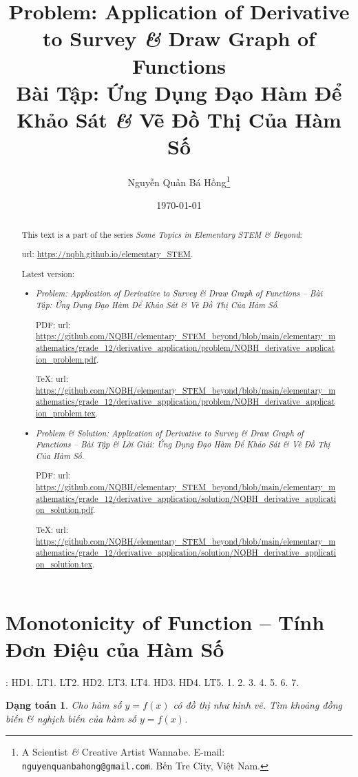 \documentclass{article}
\title{Problem: Application of Derivative to Survey {\it\&} Draw Graph of Functions\\Bài Tập: Ứng Dụng Đạo Hàm Để Khảo Sát {\it\&} Vẽ Đồ Thị Của Hàm Số}
\author{Nguyễn Quản Bá Hồng\footnote{A Scientist {\it\&} Creative Artist Wannabe. E-mail: {\tt nguyenquanbahong@gmail.com}. Bến Tre City, Việt Nam.}}
\date{\today}
\newtheorem{dangtoan}{Dạng toán}
\begin{document}
\maketitle
\begin{abstract}
	This text is a part of the series {\it Some Topics in Elementary STEM \& Beyond}:
	
	{\sc url}: \url{https://nqbh.github.io/elementary_STEM}.
	
	Latest version:
	\begin{itemize}
		\item {\it Problem: Application of Derivative to Survey \& Draw Graph of Functions -- Bài Tập: Ứng Dụng Đạo Hàm Để Khảo Sát \& Vẽ Đồ Thị Của Hàm Số}.
		
		PDF: {\sc url}: \url{https://github.com/NQBH/elementary_STEM_beyond/blob/main/elementary_mathematics/grade_12/derivative_application/problem/NQBH_derivative_application_problem.pdf}.
		
		\TeX: {\sc url}: \url{https://github.com/NQBH/elementary_STEM_beyond/blob/main/elementary_mathematics/grade_12/derivative_application/problem/NQBH_derivative_application_problem.tex}.
		\item {\it Problem \& Solution: Application of Derivative to Survey \& Draw Graph of Functions -- Bài Tập \& Lời Giải: Ứng Dụng Đạo Hàm Để Khảo Sát \& Vẽ Đồ Thị Của Hàm Số}.
		
		PDF: {\sc url}: \url{https://github.com/NQBH/elementary_STEM_beyond/blob/main/elementary_mathematics/grade_12/derivative_application/solution/NQBH_derivative_application_solution.pdf}.
		
		\TeX: {\sc url}: \url{https://github.com/NQBH/elementary_STEM_beyond/blob/main/elementary_mathematics/grade_12/derivative_application/solution/NQBH_derivative_application_solution.tex}.
	\end{itemize}
\end{abstract}
\tableofcontents


\section{Monotonicity of Function -- Tính Đơn Điệu của Hàm Số}
\cite[Chap. I, \S1, pp. 5--14]{SGK_Toan_12_CD_tap_1}: HD1. LT1. LT2. HD2. LT3. LT4. HD3. HD4. LT5. 1. 2. 3. 4. 5. 6. 7.

\begin{dangtoan}
	Cho hàm số $y = f(x)$ có đồ thị như hình vẽ. Tìm khoảng đồng biến \& nghịch biến của hàm số $y = f(x)$.
\end{dangtoan}
\end{document}
